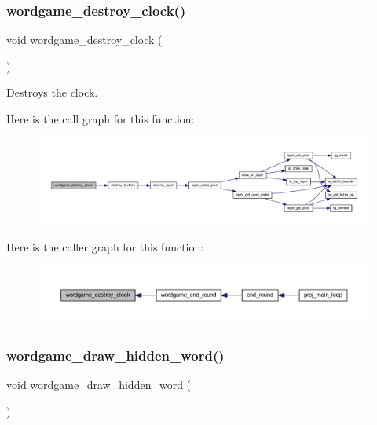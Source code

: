 \subsubsection{\texorpdfstring{wordgame\+\_\+destroy\+\_\+clock()}{wordgame\_destroy\_clock()}}
{\footnotesize\ttfamily void wordgame\+\_\+destroy\+\_\+clock (\begin{DoxyParamCaption}{ }\end{DoxyParamCaption})}



Destroys the clock. 

Here is the call graph for this function\+:\nopagebreak
\begin{figure}[H]
\begin{center}
\leavevmode
\includegraphics[width=350pt]{group__wordpicker_gac613632e3bb4704baaa134a857bb30c2_cgraph}
\end{center}
\end{figure}
Here is the caller graph for this function\+:\nopagebreak
\begin{figure}[H]
\begin{center}
\leavevmode
\includegraphics[width=350pt]{group__wordpicker_gac613632e3bb4704baaa134a857bb30c2_icgraph}
\end{center}
\end{figure}
\mbox{\label{group__wordpicker_gace6e5a32a72b4f595817f2275c431401}} 
\subsubsection{\texorpdfstring{wordgame\+\_\+draw\+\_\+hidden\+\_\+word()}{wordgame\_draw\_hidden\_word()}}
{\footnotesize\ttfamily void wordgame\+\_\+draw\+\_\+hidden\+\_\+word (\begin{DoxyParamCaption}{ }\end{DoxyParamCaption})}



